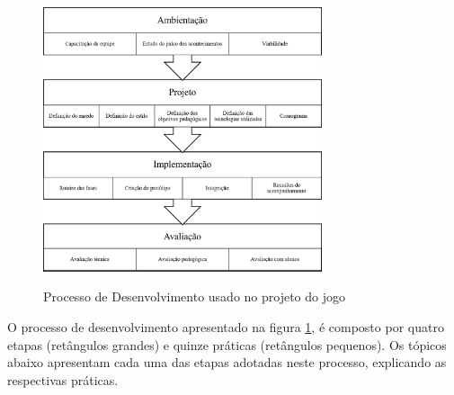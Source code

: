 \begin{figure}[H]
	\centering
	\caption{Processo de Desenvolvimento usado no projeto do jogo}
	\includegraphics[width=0.73\textwidth]{figuras/framework_dev.PNG}
	\label{fig:framework_dev}
	{}
\end{figure}

O processo de desenvolvimento apresentado na figura \ref{fig:framework_dev}, é composto por quatro etapas (retângulos grandes) e quinze práticas (retângulos pequenos). Os tópicos abaixo apresentam cada uma das etapas adotadas neste processo, explicando as respectivas práticas.

